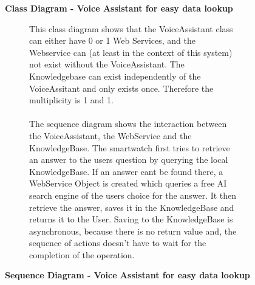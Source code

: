 \documentclass{article}
\begin{document}
		\begin{figure}[htbp]
			\centering
			\textbf{Class Diagram - Voice Assistant for easy data lookup}
			\begin{subfigure}{\textwidth}
				\centering
				\resizebox{\textwidth}{!}{}
			\end{subfigure}
			\begin{subfigure}{\textwidth}
				\vspace{1em}
				This class diagram shows that the VoiceAssistant class can either have 0 or 1 Web Services, and the Webservice can (at least in the context of this system)
				not exist without the VoiceAssistant. The Knowledgebase can exist independently of the VoiceAssitant and only exists once. Therefore the multiplicity is 1 and 1.
				\\ \\
				The sequence diagram shows the interaction between the VoiceAssistant, the WebService and the KnowledgeBase. 
				The smartwatch first tries to retrieve an answer to the users question by querying the local KnowledgeBase.
				If an answer cant be found there, a WebService Object is created which queries a free AI search engine of the users choice for the answer.
				It then retrieve the answer, saves it in the KnowledgeBase and returns it to the User. Saving to the KnowledgeBase is asynchronous,
				because there is no return value and, the sequence of actions doesn't have to wait for the completion of the operation.
			\end{subfigure}
		\end{figure}
		\clearpage
		
		\begin{figure}[htbp]
			\centering
			\textbf{Sequence Diagram - Voice Assistant for easy data lookup}
			\begin{subfigure}{\textwidth}
				\centering
				
			\end{subfigure}
			\begin{subfigure}{\textwidth}
			
			\end{subfigure}
		\end{figure} 
		\clearpage
\end{document}
